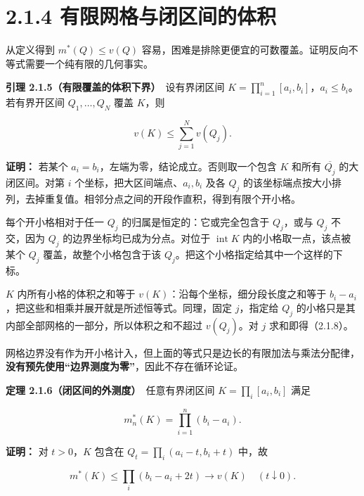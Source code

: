 \documentclass[11pt,a4paper]{article}
\begin{document}
\section[\S{}2.1.4
有限网格与闭区间的体积]{2.1.4
有限网格与闭区间的体积}\label{ux6709ux9650ux7f51ux683cux4e0eux95edux533aux95f4ux7684ux4f53ux79ef}

从定义得到 \(m^*(Q)\le v(Q)\)
容易，困难是排除更便宜的可数覆盖。证明反向不等式需要一个纯有限的几何事实。

\textbf{引理 2.1.5（有限覆盖的体积下界）}　设有界闭区间
\(K=\prod_{i=1}^n[a_i,b_i]\)，\(a_i\le b_i\)。若有界开区间
\(Q_1,\ldots,Q_N\) 覆盖 \(K\)，则

\begin{equation*}
v(K)\le\sum_{j=1}^Nv(Q_j).
\tag{2.1.8}
\end{equation*}

\textbf{证明：} 若某个 \(a_i=b_i\)，左端为零，结论成立。否则取一个包含
\(K\) 和所有 \(\overline{Q_j}\) 的大闭区间。对第 \(i\)
个坐标，把大区间端点、\(a_i,b_i\) 及各 \(Q_j\)
的该坐标端点按大小排列，去掉重复值。相邻分点之间的开段作直积，得到有限个开小格。

每个开小格相对于任一 \(Q_j\) 的归属是恒定的：它或完全包含于
\(Q_j\)，或与 \(Q_j\) 不交，因为 \(Q_j\) 的边界坐标均已成为分点。对位于
\(\operatorname{int}K\) 内的小格取一点，该点被某个 \(Q_j\)
覆盖，故整个小格包含于该 \(Q_j\)。把这个小格指定给其中一个这样的下标。

\(K\) 内所有小格的体积之和等于 \(v(K)\)：沿每个坐标，细分段长度之和等于
\(b_i-a_i\)，把这些和相乘并展开就是所述恒等式。同理，固定 \(j\)，指定给
\(Q_j\) 的小格只是其内部全部网格的一部分，所以体积之和不超过
\(v(Q_j)\)。对 \(j\) 求和即得（2.1.8）。

网格边界没有作为开小格计入，但上面的等式只是边长的有限加法与乘法分配律，\textbf{没有预先使用``边界测度为零''}，因此不存在循环论证。

\textbf{定理 2.1.6（闭区间的外测度）}　任意有界闭区间
\(K=\prod_i[a_i,b_i]\) 满足

\begin{equation*}
m_n^*(K)=\prod_{i=1}^n(b_i-a_i).
\tag{2.1.9}
\end{equation*}

\textbf{证明：} 对 \(t>0\)，\(K\) 包含在 \(Q_t=\prod_i(a_i-t,b_i+t)\)
中，故

\begin{equation*}
m^*(K)\le\prod_i(b_i-a_i+2t)\longrightarrow v(K)
\quad(t\downarrow0).
\tag{2.1.10}
\end{equation*}
\end{document}

